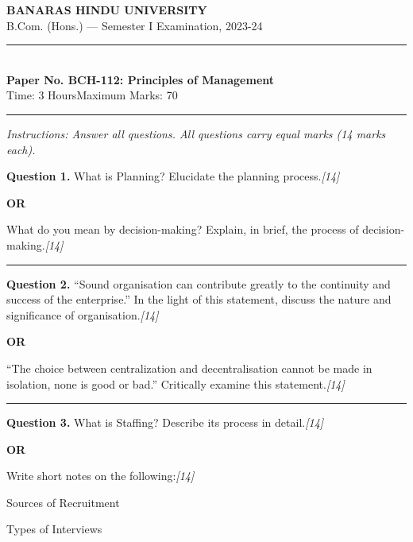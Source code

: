 \documentclass[11pt,a4paper]{article}
\newcommand{\pts}[1]{\hfill   \textit{[#1]}}
\begin{document}
\begin{center}
  {\large\bfseries BANARAS HINDU UNIVERSITY}\\[2pt]
  {\normalsize B.Com. (Hons.) --- Semester I Examination, 2023-24}\\[6pt]
  \rule{0.8\linewidth}{0.5pt}\\[6pt]
  {\large\bfseries Paper No. BCH-112: Principles of Management}\\[4pt]
  {\normalsize Time: 3 Hours\hfill Maximum Marks: 70}
\end{center}

\rule{\linewidth}{0.4pt}

\smallskip



\noindent   \textit{Instructions: Answer all questions. All questions carry equal marks (14 marks each).}

\bigskip




\noindent   \textbf{Question 1.}
What is Planning? Elucidate the planning process.\pts{14}

\centerline{   \textbf{OR}}

What do you mean by decision-making? Explain, in brief, the process of decision-making.\pts{14}

\medskip\rule{\linewidth}{0.2pt}




\noindent   \textbf{Question 2.}
``Sound organisation can contribute greatly to the continuity and success of the enterprise.'' In the light of this statement, discuss the nature and significance of organisation.\pts{14}

\centerline{   \textbf{OR}}

``The choice between centralization and decentralisation cannot be made in isolation, none is good or bad.'' Critically examine this statement.\pts{14}

\medskip\rule{\linewidth}{0.2pt}




\noindent   \textbf{Question 3.}
What is Staffing? Describe its process in detail.\pts{14}

\centerline{   \textbf{OR}}

Write short notes on the following:\pts{14}

\begin{parts}
  \item Sources of Recruitment
  \item Types of Interviews
\end{parts}
\end{document}
